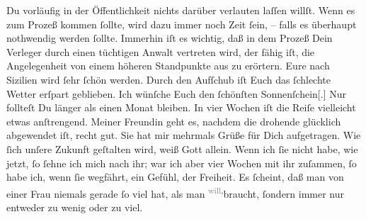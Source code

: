 \begin{ledgroupsized}[t]{13cm}
               Du vorläufig in der Öffentlichkeit nichts darüber verlauten laſſen willſt. Wenn es
               zum Prozeß kommen ſollte, wird dazu immer noch Zeit ſein, – falls es überhaupt
               nothwendig werden ſollte. Immerhin iſt es wichtig, daß in dem Prozeß Dein Verleger durch einen tüchtigen Anwalt vertreten wird, der  fähig {\pb}iſt, die Angelegenheit von einem höheren Standpunkte
               aus zu erörtern.\pend
           \pstart
           Eure\label{K_L03442-4v}\label{K_L03442-4h} nach Sizilien wird ſehr ſchön werden.
               Durch den Aufſchub iſt Euch das ſchlechte Wetter erſpart geblieben. Ich wünſche Euch
               den ſchönſten Sonnenſchein{[}.{]} Nur follteſt Du länger als einen
               Monat bleiben. In vier Wochen iſt die Reiſe vielleicht etwas anſtrengend.\pend
           \pstart
           Meiner Freundin geht es,
               nachdem \strikeout{\textcolor{gray}{d}} die drohende \label{K_L03442-5v}\label{K_L03442-5h}{ } glücklich abgewendet iſt, recht gut. Sie hat mir
                   mehrmals Grüße für Dich aufgetragen. Wie
               ſich unſere Zukunft geſtalten wird, weiß Gott allein. Wenn {\pb} ich ſie nicht habe,
               wie jetzt, ſo ſehne ich mich nach ihr; war ich aber vier Wochen mit ihr zuſammen, ſo
               habe ich, wenn ſie wegfährt, ein Gefühl,  der Freiheit. Es ſcheint, daß man von einer Frau niemals gerade ſo viel hat,
               als man \substVorne{}\textsuperscript{\textcolor{gray}{will},}\substDazwischen{}braucht,\substHinten{} ſondern immer nur entweder zu wenig oder zu viel.\pend

\end{ledgroupsized}
